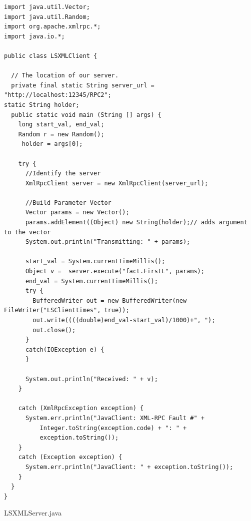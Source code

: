 \documentclass{article}
\begin{document}
\begin{lstlisting}
import java.util.Vector;
import java.util.Random;
import org.apache.xmlrpc.*;
import java.io.*;

public class LSXMLClient {

  // The location of our server.
  private final static String server_url = "http://localhost:12345/RPC2";
static String holder;
  public static void main (String [] args) {
    long start_val, end_val;
    Random r = new Random();
     holder = args[0];

    try {
      //Identify the server
      XmlRpcClient server = new XmlRpcClient(server_url);

      //Build Parameter Vector
      Vector params = new Vector();
      params.addElement((Object) new String(holder);// adds argument to the vector    
      System.out.println("Transmitting: " + params);

      start_val = System.currentTimeMillis();
      Object v =  server.execute("fact.FirstL", params);
      end_val = System.currentTimeMillis();
      try {
        BufferedWriter out = new BufferedWriter(new FileWriter("LSClienttimes", true));
        out.write((((double)end_val-start_val)/1000)+", ");
        out.close();
      }
      catch(IOException e) {
      }

      System.out.println("Received: " + v);
    }

    catch (XmlRpcException exception) {
      System.err.println("JavaClient: XML-RPC Fault #" +
          Integer.toString(exception.code) + ": " +
          exception.toString());
    }
    catch (Exception exception) {
      System.err.println("JavaClient: " + exception.toString());
    }
  }
}
\end{lstlisting}

LSXMLServer.java
\end{document}
